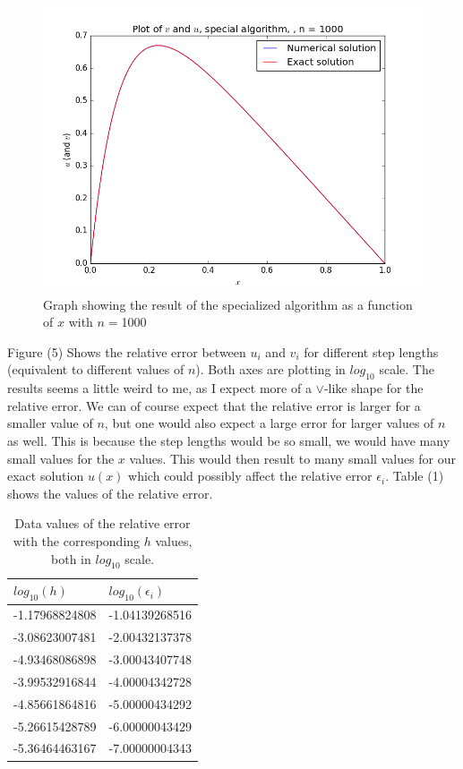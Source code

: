 \documentclass[12pt]{article}
\begin{document}
\begin{figure}[hbtp]
\centering
\includegraphics[scale=0.5]{Data_plots/Simplified_data_n1000.png}
\caption{Graph showing the result of the specialized algorithm as a function of $x$ with $n=$1000}
\end{figure}

Figure (5) Shows the relative error between $u_i$ and $v_i$ for different step lengths (equivalent to different values of $n$). Both axes are plotting in $log_{10}$ scale. The results seems a little weird to me, as I expect more of a $\vee$-like shape for the relative error. We can of course expect that the relative error is larger for a smaller value of $n$, but one would also expect a large error for larger values of $n$ as well. This is because the step lengths would be so small, we would have many small values for the $x$ values. This would then result to many small values for our exact solution $u(x)$ which could possibly affect the relative error $\epsilon_i$. Table (1) shows the values of the relative error.

\begin{table}
\begin{center}
	\begin{tabular}{| l | l |}
		$log_{10}(h)$ & $log_{10}(\epsilon_i)$ \\ \hline
		-1.17968824808 &  -1.04139268516 \\
		-3.08623007481 &  -2.00432137378 \\
		-4.93468086898 &  -3.00043407748 \\
		-3.99532916844 &  -4.00004342728 \\
		-4.85661864816 &  -5.00000434292 \\
		-5.26615428789 &  -6.00000043429 \\
		-5.36464463167 &  -7.00000004343 \\
		 \hline
	\end{tabular}
\caption{Data values of the relative error with the corresponding $h$ values, both in $log_{10}$ scale.}
\end{center}
\end{table}
\end{document}
